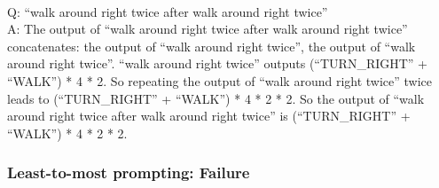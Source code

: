 {\\
Q: ``walk around right twice after walk around right twice'' \\
A: The output of ``walk around right twice after walk around right twice'' concatenates: the output of ``walk around right twice'', the output of ``walk around right twice''. ``walk around right twice'' outputs (``TURN\_RIGHT'' + ``WALK'') * 4 * 2. So repeating the output of ``walk around right twice'' twice leads to (``TURN\_RIGHT'' + ``WALK'') * 4 * 2 * 2. So the output of ``walk around right twice after walk around right twice'' is (``TURN\_RIGHT'' + ``WALK'') * 4 * 2 * 2. \\
}

\subsubsection{Least-to-most prompting: Failure}
